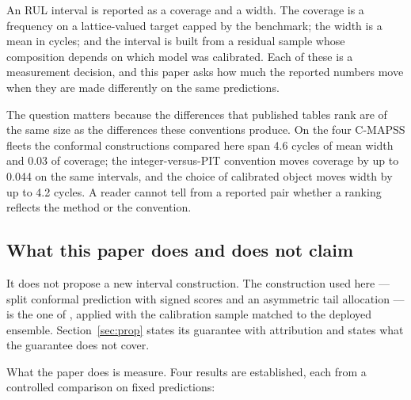 \documentclass[journal]{IEEEtran}
\begin{document}
An RUL interval is reported as a coverage and a width. The coverage is a frequency on a
lattice-valued target capped by the benchmark; the width is a mean in cycles; and the
interval is built from a residual sample whose composition depends on which model was
calibrated. Each of these is a measurement decision, and this paper asks how much the
reported numbers move when they are made differently on the same predictions.

The question matters because the differences that published tables rank are of the same size
as the differences these conventions produce. On the four C-MAPSS fleets the conformal
constructions compared here span 4.6 cycles of mean width and 0.03 of coverage; the
integer-versus-PIT convention moves coverage by up to 0.044 on the same intervals, and the
choice of calibrated object moves width by up to 4.2 cycles. A reader cannot tell from a
reported pair whether a ranking reflects the method or the convention.

\subsection{What this paper does and does not claim}

It does not propose a new interval construction. The construction used here --- split
conformal prediction with signed scores and an asymmetric tail allocation --- is the one of
\cite{vovk2005,romano2019}, applied with the calibration sample matched to the deployed
ensemble. Section~\ref{sec:prop} states its guarantee with attribution and states what the
guarantee does not cover.

What the paper does is measure. Four results are established, each from a controlled
comparison on fixed predictions:
\end{document}

